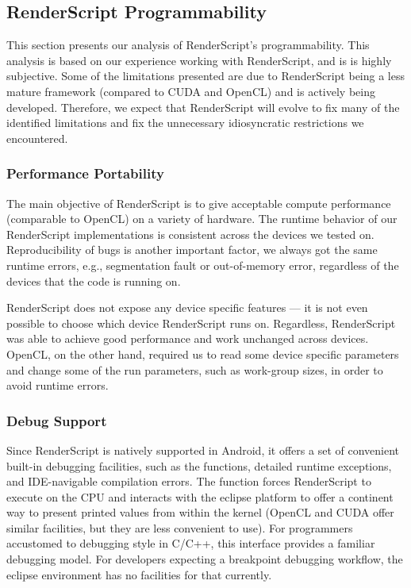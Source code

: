\subsection{RenderScript Programmability}

This section presents our analysis of RenderScript's programmability.
This analysis is based on our experience working with RenderScript, and is 
  is highly subjective.
Some of the limitations presented are due to RenderScript being a less mature
  framework (compared to CUDA and OpenCL) and is actively being developed.
Therefore, we expect that RenderScript will evolve to fix many of the
identified limitations and fix the unnecessary idiosyncratic restrictions we encountered.

\subsubsection{Performance Portability}

The main objective of RenderScript is to give acceptable compute performance
 (comparable to OpenCL) on a variety of hardware.
The runtime behavior of our RenderScript implementations is consistent across
the devices we tested on.
Reproducibility of bugs is another important factor, we
always got the same runtime errors, e.g., segmentation fault or out-of-memory
error, regardless of the devices that the code is running on.

RenderScript does not expose any device specific features --- it is not even 
 possible to choose which device RenderScript runs on.
Regardless, RenderScript was able to achieve good performance and work unchanged 
 across devices.
OpenCL, on the other hand, required us to read some device specific parameters
 and change some of the run parameters, such as work-group sizes, in order to avoid 
 runtime errors.

\subsubsection{Debug Support}

Since RenderScript is natively supported in Android,
it offers a set of convenient built-in debugging
facilities, such as the  functions, detailed runtime exceptions,
and IDE-navigable compilation errors.
The  function forces RenderScript to execute on the CPU and interacts 
with the eclipse platform to offer a continent way to present printed values from within the kernel
(OpenCL and CUDA offer similar facilities, but they are less convenient to use).
For programmers accustomed to  debugging style in C/C++, this interface provides
a familiar debugging model. For developers expecting a breakpoint debugging workflow, the eclipse
environment has no facilities for that currently.


